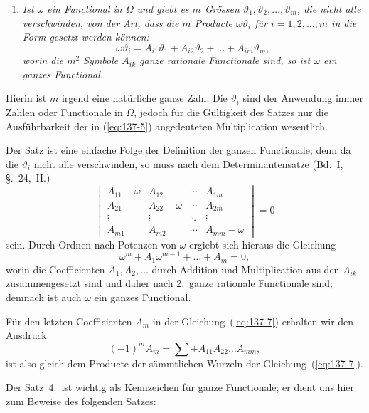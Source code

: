 \documentclass[12pt,a4paper]{article}
\theoremstyle{definition}
\begin{document}
\newpage

\begin{enumerate}[label=\arabic*., resume]
\item \textit{Ist $\omega$ ein Functional in $\Omega$ und giebt es $m$ Grössen $\vartheta_1,\vartheta_2,\dots,\vartheta_m$, die nicht alle verschwinden, von der Art, dass die $m$ Producte $\omega\vartheta_i$ für $i=1,2,\dots,m$ in die Form gesetzt werden können:}
\begin{equation}\label{eq:137-5}
\omega\vartheta_i = A_{i1}\vartheta_1 + A_{i2}\vartheta_2 + \dots + A_{im}\vartheta_m,
\end{equation}
\textit{worin die $m^2$ Symbole $A_{ik}$ ganze rationale Functionale sind, so ist $\omega$ ein ganzes Functional.}
\end{enumerate}

Hierin ist $m$ irgend eine natürliche ganze Zahl. Die $\vartheta_i$ sind der Anwendung immer Zahlen oder Functionale in $\Omega$, jedoch für die Gültigkeit des Satzes nur die Ausführbarkeit der in (\ref{eq:137-5}) angedeuteten Multiplication wesentlich.

Der Satz ist eine einfache Folge der Definition der ganzen Functionale; denn da die $\vartheta_i$ nicht alle verschwinden, so muss nach dem Determinantensatze (Bd.~I, \S.~24,~II.)
\[
\begin{vmatrix}
A_{11}-\omega & A_{12} & \cdots & A_{1m}\\
A_{21} & A_{22}-\omega & \cdots & A_{2m}\\
\vdots & \vdots & \ddots & \vdots\\
A_{m1} & A_{m2} & \cdots & A_{mm}-\omega
\end{vmatrix}
= 0
\]
sein. Durch Ordnen nach Potenzen von $\omega$ ergiebt sich hieraus die Gleichung
\begin{equation}\label{eq:137-7}
\omega^m + A_1\omega^{m-1} + \dots + A_m = 0,
\end{equation}
worin die Coefficienten $A_1,A_2,\dots$ durch Addition und Multiplication aus den $A_{ik}$ zusammengesetzt sind und daher nach 2.\ ganze rationale Functionale sind; demnach ist auch $\omega$ ein ganzes Functional.

Für den letzten Coefficienten $A_m$ in der Gleichung~(\ref{eq:137-7}) erhalten wir den Ausdruck
\[
(-1)^m A_m = \sum \pm A_{11}A_{22}\dots A_{mm},
\]
ist also gleich dem Producte der sämmtlichen Wurzeln der Gleichung~(\ref{eq:137-7}).

Der Satz~4.\ ist wichtig als Kennzeichen für ganze Functionale; er dient uns hier zum Beweise des folgenden Satzes:
\end{document}
